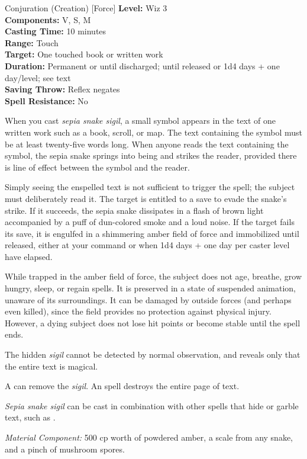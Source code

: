 {Conjuration (Creation) [Force]}
{
	\textbf{Level:}
	Wiz 3\\
	\textbf{Components:}
	V, S, M\\
	\textbf{Casting Time:}
	10 minutes\\
	\textbf{Range:}
	Touch\\
	\textbf{Target:}
	One touched book or written work\\
	\textbf{Duration:}
	Permanent or until discharged; until released or 1d4 days + one day/level; see text\\
	\textbf{Saving Throw:}
	Reflex negates\\
	\textbf{Spell Resistance:}
	No\\
}
{
	When you cast \emph{sepia snake sigil}, a small symbol appears in the text of one written work such as a book, scroll, or map. The text containing the symbol must be at least twenty-five words long. When anyone reads the text containing the symbol, the sepia snake springs into being and strikes the reader, provided there is line of effect between the symbol and the reader.

	Simply seeing the enspelled text is not sufficient to trigger the spell; the subject must deliberately read it. The target is entitled to a save to evade the snake's strike. If it succeeds, the sepia snake dissipates in a flash of brown light accompanied by a puff of dun-colored smoke and a loud noise. If the target fails its save, it is engulfed in a shimmering amber field of force and immobilized until released, either at your command or when 1d4 days + one day per caster level have elapsed.

	While trapped in the amber field of force, the subject does not age, breathe, grow hungry, sleep, or regain spells. It is preserved in a state of suspended animation, unaware of its surroundings. It can be damaged by outside forces (and perhaps even killed), since the field provides no protection against physical injury. However, a dying subject does not lose hit points or become stable until the spell ends.

	The hidden \emph{sigil} cannot be detected by normal observation, and  reveals only that the entire text is magical.

	A  can remove the \emph{sigil}. An  spell destroys the entire page of text.

	\emph{Sepia snake sigil} can be cast in combination with other spells that hide or garble text, such as .

	\textit{Material Component:}
	500 cp worth of powdered amber, a scale from any snake, and a pinch of mushroom spores.

}
